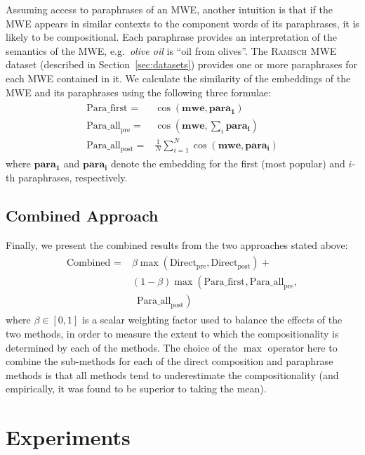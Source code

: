\documentclass[11pt,a4paper]{article}
\newcommand{\lex}[1]{\textit{#1}\xspace}
\newcommand{\gloss}[1]{``#1''\xspace}
\newcommand{\dataset}[2][]{\textsc{#2}$_{\text{#1}}$\xspace}
\newcommand{\ramisch}{\dataset{Ramisch}}
\newcommand{\method}[2][]{\ensuremath{\text{#2}_{\text{#1}}}\xspace}
\newcommand{\presum}{\method[pre]{Direct}}
\newcommand{\postsum}{\method[post]{Direct}}
\newcommand{\firstpara}{\method{Para\_first}}
\newcommand{\avgparapre}{\method[pre]{Para\_all}}
\newcommand{\avgparapost}{\method[post]{Para\_all}}
\newcommand{\combined}{\method{Combined}}
\newcommand{\MWEvec}{\ensuremath{\mathbf{mwe}}\xspace}
\newcommand{\paravec}[1][]{\ensuremath{\mathbf{para_{#1}}}\xspace}
\newcommand{\secref}[2][]{Section#1~\ref{#2}\xspace}
\begin{document}
Assuming access to paraphrases of an MWE, another intuition is that if the MWE appears in similar contexts to the component words of its paraphrases, it is likely to be compositional. Each paraphrase provides an interpretation of the semantics of the MWE, e.g.\ \lex{olive oil} is \gloss{oil from olives}. The \ramisch MWE dataset (described in \secref{sec:datasets}) provides one or more paraphrases for each MWE contained in it. We calculate the similarity of the embeddings of the MWE and its paraphrases using the following three formulae:
\begin{eqnarray*}
  \begin{split}
\firstpara = & \cos(\MWEvec, \paravec[1])\\
\avgparapre = & \cos(\MWEvec, \sum_i \paravec[i])\\
\avgparapost = & \frac{1}{N} \sum_{i=1}^N \cos(\MWEvec, \paravec[i])
  \end{split}
\end{eqnarray*}
where \paravec[1] and \paravec[i] denote the embedding for the first (most popular) and $i$-th paraphrases, respectively.

\subsection{Combined Approach}
\label{sec:combined}

Finally, we present the combined results from the two approaches stated above:
\begin{eqnarray*}
  \begin{split}
    \combined = & \beta\max\left(\presum, \postsum\right) + \\
    & (1 - \beta)\max\left(\firstpara, \avgparapre, \right.\\
    & \,\,\,\left.\avgparapost\right)
  \end{split}
\end{eqnarray*}
where $\beta\in[0,1]$ is a scalar weighting factor used to balance the effects of the two methods, in order to measure the extent to which the compositionality is determined by each of the methods. The choice of the $\max$ operator here to combine the sub-methods for each of the direct composition and paraphrase methods is that all methods tend to underestimate the compositionality (and empirically, it was found to be superior to taking the mean).

\section{Experiments}
\end{document}
